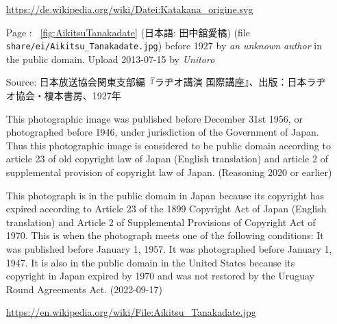 \begin{itemize}
            \url{https://de.wikipedia.org/wiki/Datei:Katakana_origine.svg}

    \item[Page \pageref{fig:AikitsuTanakadate}:] ~\ref{fig:AikitsuTanakadate}
            \textit{} (日本語: 田中舘愛橘) (file
            \texttt{share/ei/Aikitsu\_Tanakadate.jpg}) before 1927 by
            \textit{an unknown author} in the public domain.  Upload 2013-07-15
            by \textit{Unitoro}

            Source: 日本放送協会関東支部編『ラヂオ講演 国際講座』、出版：日本ラヂオ協会・榎本書房、1927年

            This photographic image was published before December 31st 1956, or
            photographed before 1946, under jurisdiction of the Government of
            Japan. Thus this photographic image is considered to be public
            domain according to article 23 of old copyright law of Japan
            (English translation) and article 2 of supplemental provision of
            copyright law of Japan. (Reasoning 2020 or earlier)

            This photograph is in the public domain in Japan because its
            copyright has expired according to Article 23 of the 1899 Copyright
            Act of Japan (English translation) and Article 2 of Supplemental
            Provisions of Copyright Act of 1970. This is when the photograph
            meets one of the following conditions: It was published before
            January 1, 1957.  It was photographed before January 1, 1947.  It
            is also in the public domain in the United States because its
            copyright in Japan expired by 1970 and was not restored by the
            Uruguay Round Agreements Act. (2022-09-17)

            \url{https://en.wikipedia.org/wiki/File:Aikitsu_Tanakadate.jpg}

\end{itemize}

